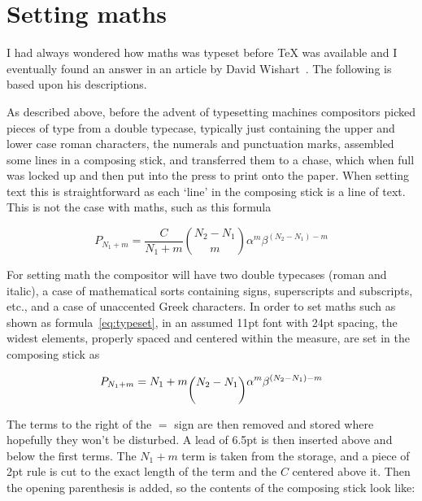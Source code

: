 \documentclass[10pt,letterpaper,extrafontsizes]{memoir}
\begin{document}
\section{Setting maths}

    I had always wondered how maths was typeset before TeX was available and
I eventually found an answer in an article by David Wishart~\autocite{WISHART03}.
The following is based upon his descriptions.

    As described above, before the advent of typesetting machines compositors 
picked pieces of type from a double typecase, 
typically just containing the 
upper and lower case roman characters, the numerals and punctuation marks, 
assembled some lines in a composing stick, 
and transferred them to a chase, which when full was locked 
up and then 
put into the press to print onto the paper. When setting text this is
straightforward as each `line' in the composing stick is a line of text.
This is not the case with maths, such as this formula

\begin{equation} \label{eq:typeset}
P_{N_1 + m} = \frac{C}{N_{1} + m} \binom{N_{2} - N_{1}}{m}
              \alpha^{m}\beta^{(N_{2}-N_{1}) - m}
\end{equation}

    For setting math the compositor will have two double 
typecases (roman
and italic), a case of mathematical sorts containing signs, superscripts
and subscripts, etc., and a case of unaccented Greek characters.
    In order to set maths such as shown as formula~\ref{eq:typeset},
in an assumed 11pt font with 24pt spacing, 
the widest elements, properly spaced and centered within the measure, 
are set in the composing stick as

\begin{displaymath}
P_{N_1 + m} = N_{1} + m \raisebox{-0.6\baselineskip}{$\displaystyle\binom{N_{2} - N_{1}}{\phantom{m}}$}
              \alpha^{m}\beta^{(N_{2}-N_{1}) - m}
\end{displaymath}

    The terms to the right of the $=$ sign are then removed and stored where
hopefully they won't be disturbed. A lead of 6.5pt is then inserted above and below 
the first terms.
The $N_{1} +m$ term is taken from the storage, and a piece of 2pt rule is cut
to the exact length of the term and the $C$ centered above it. Then the opening
parenthesis is added, so the contents of the composing stick look like:
\end{document}

